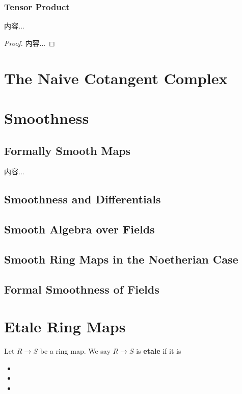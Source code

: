 \documentclass[Total.tex]{subfiles}
\begin{document}
			\subsubsection{Tensor Product}
			\begin{proposition}
				内容...
			\end{proposition}
			\begin{proof}
				内容...
			\end{proof}
		\section{The Naive Cotangent Complex}
		\section{Smoothness}
			\subsection{Formally Smooth Maps}
				\begin{Def}
					内容...
				\end{Def}
			\subsection{Smoothness and Differentials}
			\subsection{Smooth Algebra over Fields}
			\subsection{Smooth Ring Maps in the Noetherian Case}
			\subsection{Formal Smoothness of Fields}
		\section{Etale Ring Maps}
			\begin{Def}
				Let $R\rightarrow S$ be a ring map. We say $R\rightarrow S$ is \textbf{etale} if it is
				\begin{itemize}
					\item 
					\item 
					\item 
				\end{itemize}
			\end{Def}
		
\end{document}
